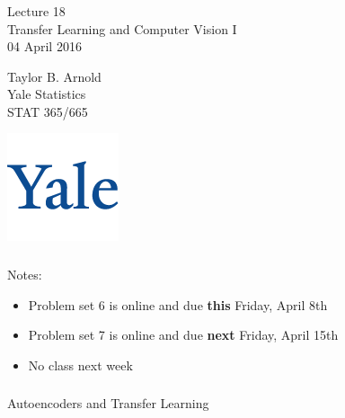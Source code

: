 \documentclass[xetex,mathserif,serif,aspectratio=169]{beamer}
\begin{document}
\begin{frame}[fragile] \frametitle{} \oldB \small

\vfill

{\fontsize{0.7cm}{0cm}\selectfont Lecture 18 \\\vspace{0.2cm}
Transfer Learning and Computer Vision I}\\\vspace{0.5cm}
04 April 2016

\vspace{2cm}

\begin{minipage}{0.6\textwidth}
Taylor B. Arnold \\
Yale Statistics \\
STAT 365/665
\end{minipage}
\hfill
\begin{minipage}{0.3\textwidth}\raggedleft
\includegraphics[scale=0.3]{../yale-logo.png}
\end{minipage}%

\end{frame}

\begin{frame}[fragile] \frametitle{} \oldB \small

Notes:
\begin{itemize}
\item Problem set 6 is online and due \textbf{this} Friday, April 8th
\item Problem set 7 is online and due \textbf{next} Friday, April 15th
\item No class next week
\end{itemize}

\end{frame}

\begin{frame}[fragile] \frametitle{}

\begin{flushright}
{\color{yaleblue}\sc\fontsize{1cm}{0.5cm}\selectfont Autoencoders and Transfer Learning}
\end{flushright}

\end{frame}
\end{document}
